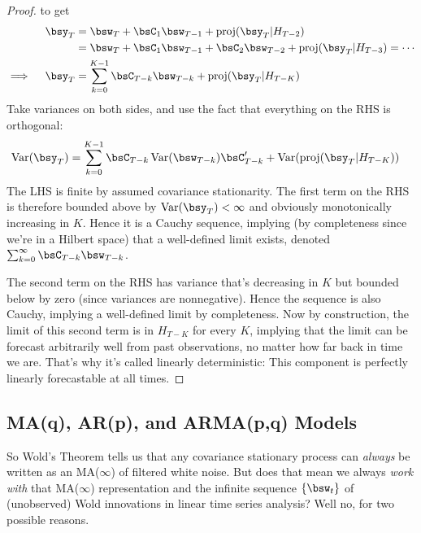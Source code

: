 \documentclass[12pt]{article}
\theoremstyle{plain}
\theoremstyle{definition}
\theoremstyle{remark}
\newcommand{\Var}{\operatorname{Var}}
\newcommand{\proj}{\operatorname{proj}}
\begin{document}
\begin{proof}
to get
\begin{align*}
  \bsy_T
  &=
  \bsw_T + \bsC_1\bsw_{T-1}
  + \proj(\bsy_T|H_{T-2})
  \\
  &=
  \bsw_T + \bsC_1\bsw_{T-1}
  + \bsC_2\bsw_{T-2}
  + \proj(\bsy_T|H_{T-3})
  =\cdots
  \\
  \implies\quad
  \bsy_T
  &=
  \sum_{k=0}^{K-1} \bsC_{T-k}\bsw_{T-k}
  + \proj(\bsy_T|H_{T-K})
\end{align*}
Take variances on both sides, and use the fact that everything on the
RHS is orthogonal:
\begin{align*}
  \Var(\bsy_T)
  &=
  \sum_{k=0}^{K-1} \bsC_{T-k}\Var(\bsw_{T-k})\bsC_{T-k}'
  + \Var(\proj(\bsy_T|H_{T-K}))
\end{align*}
The LHS is finite by assumed covariance stationarity. The first term on
the RHS is therefore bounded above by $\Var(\bsy_T)<\infty$ and
obviously monotonically increasing in $K$. Hence it is a Cauchy
sequence, implying (by completeness since we're in a Hilbert space) that
a well-defined limit exists, denoted
$\sum_{k=0}^\infty \bsC_{T-k}\bsw_{T-k}$.

The second term on the RHS has variance that's decreasing in $K$ but
bounded below by zero (since variances are nonnegative).
Hence the sequence is also Cauchy, implying a well-defined limit by
completeness.
Now by construction, the limit of this second term is in $H_{T-K}$ for
every $K$, implying that the limit can be forecast arbitrarily well from
past observations, no matter how far back in time we are.
That's why it's called linearly deterministic: This component is
perfectly linearly forecastable at all times.
\end{proof}




\clearpage
\subsection{MA(q), AR(p), and ARMA(p,q) Models}

So Wold's Theorem tells us that any covariance stationary process can
\emph{always} be written as an MA($\infty$) of filtered white noise.
But does that mean we always \emph{work with} that MA($\infty$)
representation and the infinite sequence $\{\bsw_t\}$ of (unobserved)
Wold innovations in linear time series analysis?
Well no, for two possible reasons.
\end{document}
